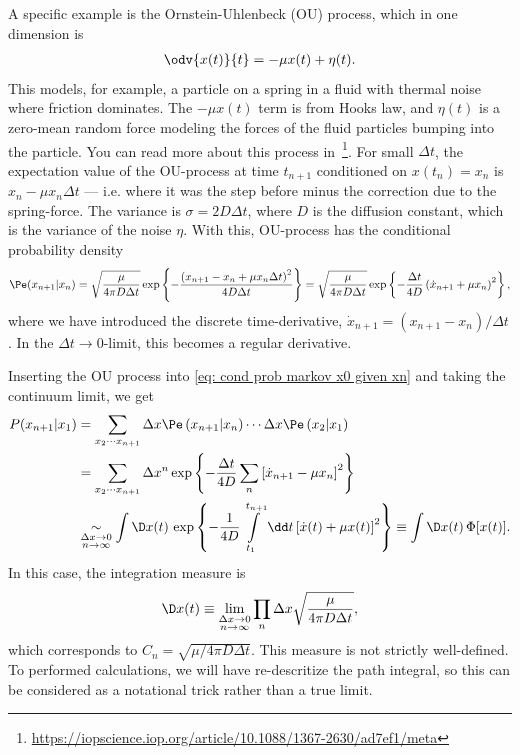A specific example is the Ornstein-Uhlenbeck (OU) process, which in one dimension is
%
\begin{align}
    \odv{ x(t) }{ t } = - \mu x(t) + \eta(t).
\end{align}
%
This models, for example, a particle on a spring in a fluid with thermal noise where friction dominates.
The $-\mu x(t)$ term is from Hooks law, and $\eta(t)$ is a zero-mean random force modeling the forces of the fluid particles bumping into the particle.
You can read more about this process in~\footnote{\url{https://iopscience.iop.org/article/10.1088/1367-2630/ad7ef1/meta}}.
For small $\Delta t$, the expectation value of the OU-process at time $t_{n+1}$ conditioned on $x(t_n)=x_n$ is $x_n - \mu x_n \Delta t$ --- i.e. where it was the step before minus the correction due to the spring-force.
The variance is $\sigma = 2D \Delta t$, where $D$ is the diffusion constant, which is the variance of the noise $\eta$.
With this, OU-process has the conditional probability density
%
\begin{align}
    \Pe(x_{n + 1}| x_n) 
    = \sqrt{ \frac{ \mu }{ 4 \pi D \Delta t } }
    \exp \left\{ -
    \frac{ \left(x_{n + 1} - x_n + \mu x_n \Delta t\right)^2 }{ 4 D \Delta t } 
    \right\}
    = \sqrt{ \frac{ \mu }{ 4 \pi D \Delta t } }
    \exp \left\{ 
    - \frac{ \Delta t }{ 4 D }  \left(\dot x_{n + 1} + \mu x_n\right)^2
    \right\},
\end{align}
%
where we have introduced the discrete time-derivative, $\dot x_{n+1} = (x_{n + 1} - x_n) / \Delta t$.
In the $\Delta t \rightarrow 0$-limit, this becomes a regular derivative.



Inserting the OU process into \autoref{eq: cond prob markov x0 given xn} and taking the continuum limit, we get
%
\begin{align}
    P(x_{n+1}|x_{1})
    & =
    \sum_{x_2\cdots x_{n+1}}
    \Delta x \Pe \left( x_{n+1}| x_{n} \right) \cdots \Delta x \Pe \left( x_{2}| x_{1} \right)\\
    &
    = \sum_{x_2\cdots x_{n+1}} \Delta x^n \exp \left\{ - \frac{\Delta t}{4 D} \sum_n \left[\dot x_{n + 1} - \mu x_n \right]^2 \right\}\\
    & 
    \underset{\substack{\Delta x \rightarrow 0\\ n \rightarrow \infty} }{ \sim }
    \int \D x(t) \,
    \exp \left\{ 
        - \frac{ 1 }{ 4D } 
        \int\limits_{t_1}^{t_{n+1}} \dd t \left[\dot x(t) + \mu x(t)\right]^2
        \right\}
    \equiv
    \int \D x(t) \, \Phi[x(t)].
\end{align}
%
In this case, the integration measure is
%
\begin{align}
    \D x(t) \equiv \lim_{\substack{\Delta x \rightarrow 0\\ n \rightarrow \infty} } \prod_{n} \Delta x \sqrt{ \frac{\mu}{ 4 \pi D \Delta t }},
\end{align}
%
which corresponds to $C_n = \sqrt{\mu/4\pi D \Delta t}$.
This measure is not strictly well-defined. 
To performed calculations, we will have re-descritize the path integral, so this can be considered as a notational trick rather than a true limit.


